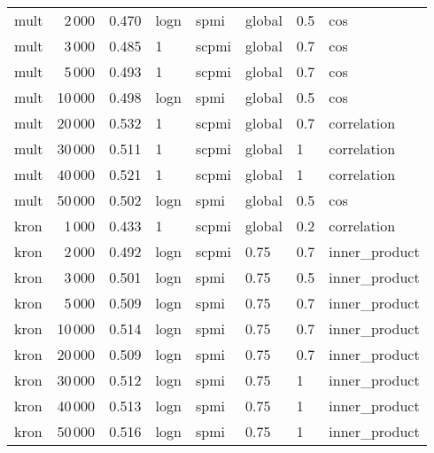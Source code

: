 \begin{tabular}{lrrlllll}
    mult &            2\,000 &  0.470 &  logn &   spmi &  global &  0.5 &            cos \\
    mult &            3\,000 &  0.485 &     1 &  scpmi &  global &  0.7 &            cos \\
    mult &            5\,000 &  0.493 &     1 &  scpmi &  global &  0.7 &            cos \\
    mult &           10\,000 &  0.498 &  logn &   spmi &  global &  0.5 &            cos \\
    mult &           20\,000 &  0.532 &     1 &  scpmi &  global &  0.7 &    correlation \\
    mult &           30\,000 &  0.511 &     1 &  scpmi &  global &    1 &    correlation \\
    mult &           40\,000 &  0.521 &     1 &  scpmi &  global &    1 &    correlation \\
    mult &           50\,000 &  0.502 &  logn &   spmi &  global &  0.5 &            cos \\
    kron &            1\,000 &  0.433 &     1 &  scpmi &  global &  0.2 &    correlation \\
    kron &            2\,000 &  0.492 &  logn &  scpmi &    0.75 &  0.7 &  inner\_product \\
    kron &            3\,000 &  0.501 &  logn &   spmi &    0.75 &  0.5 &  inner\_product \\
    kron &            5\,000 &  0.509 &  logn &   spmi &    0.75 &  0.7 &  inner\_product \\
    kron &           10\,000 &  0.514 &  logn &   spmi &    0.75 &  0.7 &  inner\_product \\
    kron &           20\,000 &  0.509 &  logn &   spmi &    0.75 &  0.7 &  inner\_product \\
    kron &           30\,000 &  0.512 &  logn &   spmi &    0.75 &    1 &  inner\_product \\
    kron &           40\,000 &  0.513 &  logn &   spmi &    0.75 &    1 &  inner\_product \\
    kron &           50\,000 &  0.516 &  logn &   spmi &    0.75 &    1 &  inner\_product \\
\bottomrule
\end{tabular}

